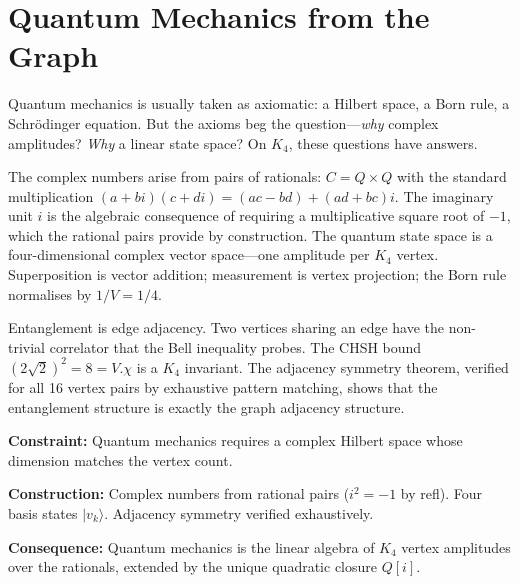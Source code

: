 \documentclass[11pt,a4paper]{book}
\def\cdot{.}%
\def\mathbb#1{#1}%
\def\texttt#1{#1}%
\begin{document}
\chapter{Quantum Mechanics from the Graph}
\label{ch:qm-from-graph}

Quantum mechanics is usually taken as axiomatic: a Hilbert space, a Born rule,
a Schr\"odinger equation.  But the axioms beg the question---\emph{why} complex
amplitudes?  \emph{Why} a linear state space?  On $K_4$, these questions have
answers.

The complex numbers arise from pairs of rationals:
$\mathbb{C} = \mathbb{Q} \times \mathbb{Q}$ with the standard multiplication
$(a + bi)(c + di) = (ac - bd) + (ad + bc)i$.  The imaginary unit $i$ is the
algebraic consequence of requiring a multiplicative square root of $-1$, which
the rational pairs provide by construction.  The quantum state space is a
four-dimensional complex vector space---one amplitude per $K_4$ vertex.
Superposition is vector addition; measurement is vertex projection; the Born
rule normalises by $1/V = 1/4$.

Entanglement is edge adjacency.  Two vertices sharing an edge have the
non-trivial correlator that the Bell inequality probes.  The CHSH bound
$(2\sqrt{2})^2 = 8 = V \cdot \chi$ is a $K_4$ invariant.  The adjacency
symmetry theorem, verified for all 16 vertex pairs by exhaustive pattern
matching, shows that the entanglement structure is exactly the graph
adjacency structure.

\textbf{Constraint:}
Quantum mechanics requires a complex Hilbert space whose dimension matches
the vertex count.

\textbf{Construction:}
Complex numbers from rational pairs ($i^2 = -1$ by \texttt{refl}).
Four basis states $|v_k\rangle$.  Adjacency symmetry verified exhaustively.

\textbf{Consequence:}
Quantum mechanics is the linear algebra of $K_4$ vertex amplitudes over
the rationals, extended by the unique quadratic closure $\mathbb{Q}[i]$.
\end{document}
